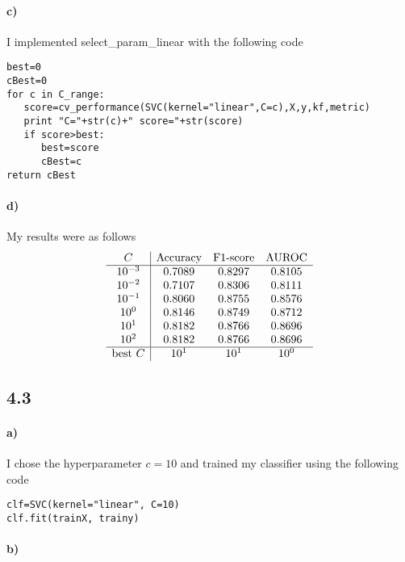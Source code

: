\documentclass[12pt]{article}
\begin{document}
\paragraph{c)}

I implemented select\_param\_linear with the following code
\begin{verbatim}
best=0
cBest=0
for c in C_range:
   score=cv_performance(SVC(kernel="linear",C=c),X,y,kf,metric)
   print "C="+str(c)+" score="+str(score)
   if score>best:
      best=score
      cBest=c
return cBest
\end{verbatim}

\paragraph{d)}

My results were as follows
\[
        \begin{array}{c|c c c}
                C & \text{Accuracy} & \text{F1-score} & \text{AUROC}\\
                \hline
                10^{-3} & 0.7089 & 0.8297 & 0.8105\\
                10^{-2} & 0.7107 & 0.8306 & 0.8111\\
                10^{-1} & 0.8060 & 0.8755 & 0.8576\\
                10^0 & 0.8146 & 0.8749 & 0.8712\\
                10^1 & 0.8182 & 0.8766 & 0.8696\\
                10^2 & 0.8182 & 0.8766 & 0.8696\\
                \hline
                \text{best } C & 10^1 & 10^1 & 10^0
        \end{array}
\]

\subsection*{4.3}

\paragraph{a)}

I chose the hyperparameter \(c=10\) and trained my classifier using the following code
\begin{verbatim}
clf=SVC(kernel="linear", C=10)
clf.fit(trainX, trainy)
\end{verbatim}

\paragraph{b)}
\end{document}
